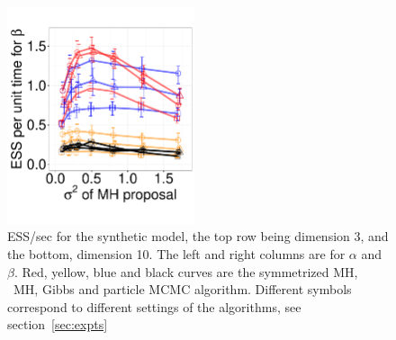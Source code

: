 \begin{figure}[H]
\begin{minipage}[!hp]{0.69\linewidth}
    \includegraphics [width=0.49\textwidth, angle=0]{figs/exp_10_beta.pdf}
  \end{minipage}
  \begin{minipage}[!hp]{0.3\linewidth}
    \caption{ESS/sec for the synthetic  model, the top row being dimension 3, and the bottom, dimension 10. The left and right columns are for $\alpha$ and $\beta$. Red, yellow, blue and black curves are the symmetrized MH, \naive\ MH, Gibbs and particle MCMC algorithm. Different symbols correspond to different settings of the algorithms, see section~\ref{sec:expts}}
     \label{fig:ESS_EXP_D10}
  \end{minipage}
  \end{figure}



